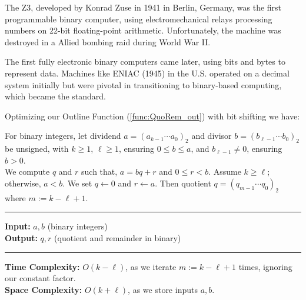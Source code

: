 \begin{Tip}
    The Z3, developed by Konrad Zuse in 1941 in Berlin, Germany, was the first programmable binary computer, using electromechanical relays processing numbers on 22-bit floating-point arithmetic. Unfortunately, the machine was destroyed in a Allied bombing raid during World War II.
    
    The first fully electronic binary computers came later, using bits and bytes to represent data. Machines like ENIAC (1945) in the U.S. operated on a decimal system initially but were pivotal in transitioning to binary-based computing, which became the standard.
    
    \end{Tip}

\newpage

\noindent
Optimizing our Outline Function (\ref{func:QuoRem_out}) with bit shifting we have:

\begin{Func}

    \label{func:QuoRem}

    For binary integers, let dividend $a = (a_{k-1} \cdots a_0)_2$ and divisor $b = (b_{\ell-1} \cdots b_0)_2$ be unsigned, with $k \geq 1$,
    $\ell \geq 1$, ensuring $0 \leq b \leq a$, and $b_{\ell-1} \neq 0$, ensuring $b > 0$.\\ 
    
    \noindent
    We compute $q$ and $r$ such that, $a = bq + r$ and $0 \leq r < b$. 
    Assume $k \geq \ell$; otherwise, $a < b$. We set $q \gets 0$ and $r \gets a$. 
    Then quotient $q = (q_{m-1} \cdots q_0)_2$ where $m := k - \ell + 1$.

    \noindent\rule{\textwidth}{0.4pt}

    \vspace{.5em}
    \noindent
    \textbf{Input:} $a, b$ (binary integers)\\
    \noindent
    \textbf{Output:} $q, r$ (quotient and remainder in binary)\\
    \begin{algorithm}[H]
        \SetAlgoLined
    \end{algorithm}
    \noindent\rule{\textwidth}{0.4pt}
    \noindent

    \noindent
    \textbf{Time Complexity:} $O(k-\ell)$, as we iterate $m := k - \ell + 1$ times, ignoring our constant factor.\\
    \textbf{Space Complexity:} $O(k + \ell)$, as we store inputs $a, b$.
\end{Func}

